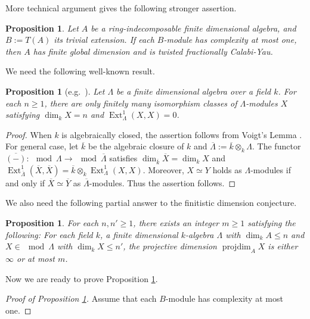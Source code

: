 \documentclass[a4paper,reqno,11pt]{amsart}
\newtheorem{proposition}[theorem]{Proposition}
\theoremstyle{definition}
\newcommand{\projdim}{\operatorname{projdim}\nolimits}
\newcommand{\Ext}{\operatorname{Ext}\nolimits}
\newcommand{\new}[1]{{\blue #1}}
\numberwithin{equation}{section}
\begin{document}
\new{
More technical argument gives the following stronger assertion.

\begin{proposition}\label{complexity one}
Let $A$ be a ring-indecomposable finite dimensional algebra, and $B:=T(A)$ its trivial extension. If each $B$-module has complexity at most one, then $A$ has finite global dimension and is twisted fractionally Calabi-Yau.
\end{proposition}

We need the following well-known result.

\begin{proposition}[e.g.\ \cite{HS}]\label{voigt}
Let $\Lambda$ be a finite dimensional algebra over a field $k$. For each $n\ge1$, there are only finitely many isomorphism classes of $\Lambda$-modules $X$ satisfying $\dim_kX=n$ and $\Ext^1_\Lambda(X,X)=0$.
\end{proposition}

\begin{proof}
When $k$ is algebraically closed, the assertion follows from Voigt's Lemma \cite{V}. For general case, let $\overline{k}$ be the algebraic closure of $k$ and $\overline{\Lambda}:=\overline{k}\otimes_k\Lambda$. The functor $\overline{(-)}:\mod\Lambda\to\mod\overline{\Lambda}$ satisfies $\dim_{\overline{k}}\overline{X}=\dim_kX$ and $\Ext^1_{\overline{\Lambda}}(\overline{X},\overline{X})=\overline{k}\otimes_k\Ext^1_\Lambda(X,X)$.
Moreover, $X\simeq Y$ holds as $\Lambda$-modules if and only if $\overline{X}\simeq\overline{Y}$ as $\overline{\Lambda}$-modules. Thus the assertion follows.
\end{proof}

We also need the following partial answer to the finitistic dimension conjecture.

\begin{proposition}\cite{JL,HS}\label{FDC}
For each $n,n'\ge1$, there exists an integer $m\ge1$ satisfying the following:
For each field $k$, a finite dimensional $k$-algebra $\Lambda$ with $\dim_kA\le n$ and $X\in\mod\Lambda$ with $\dim_kX\le n'$, the projective dimension $\projdim_AX$ is either $\infty$ or at most $m$.
\end{proposition} 

Now we are ready to prove Proposition \ref{complexity one}.

\begin{proof}[Proof of Proposition \ref{complexity one}]
Assume that each $B$-module has complexity at most one.


\end{proof}}
\end{document}
